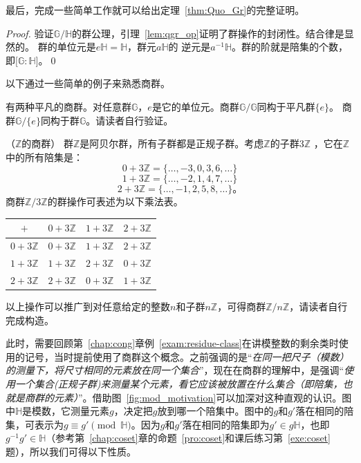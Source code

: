最后，完成一些简单工作就可以给出定理~\ref{thm:Quo_Gr}的完整证明。
\begin{proof}
验证$\mathbb{G}/ \mathbb{H}$的群公理，引理~\ref{lem:qgr_op}证明了群操作的封闭性。结合律是显然的。
群的单位元是$e\mathbb{H} = \mathbb{H}$，群元$a\mathbb{H}$的
逆元是$a^{-1}\mathbb{H}$。群的阶就是陪集的个数，即$\lbrack \mathbb{G}: \mathbb{H}\rbrack$。\qed
\end{proof}

以下通过一些简单的例子来熟悉商群。
\begin{example}
		有两种平凡的商群。对任意群$\mathbb{G}$，$e$是它的单位元。商群$\mathbb{G}/\mathbb{G}$同构于平凡群$\{e\}$。
	商群$\mathbb{G}/\{e\}$同构于群$\mathbb{G}$。请读者自行验证。
\end{example}

\begin{example}{（$\mathbb{Z}$的商群）}
群$\mathbb{Z}$是阿贝尔群，所有子群都是正规子群。考虑$\mathbb{Z}$的子群$3\mathbb{Z}$ ，它在$\mathbb{Z}$中的所有陪集是：
		\[0 + 3\mathbb{Z} = \{\ldots, -3, 0, 3, 6, \ldots \}\]
		\[1 + 3\mathbb{Z} = \{\ldots, -2, 1, 4, 7, \ldots \}\]
		\[2 + 3\mathbb{Z} = \{\ldots, -1, 2, 5, 8, \ldots \}\text{。}\]
商群$\mathbb{Z} / 3\mathbb{Z}$的群操作可表述为以下乘法表。
		
\begin{center}
		\begin{tabular}{|c|c|c|c|}
			\hline 
			$+$ & $0 + 3\mathbb{Z}$  & $1 + 3\mathbb{Z}$  &  $2 + 3\mathbb{Z}$\\ 
			\hline 
			$0 + 3\mathbb{Z}$ & $0 + 3\mathbb{Z}$ & $1 + 3\mathbb{Z}$ & $2 + 3\mathbb{Z}$ \\ 
			\hline 
			$1 + 3\mathbb{Z}$& $1 + 3\mathbb{Z}$ & $2 + 3\mathbb{Z}$ & $0 + 3\mathbb{Z}$ \\ 
			\hline 
			$2 + 3\mathbb{Z}$& $2 + 3\mathbb{Z}$ &  $0 + 3\mathbb{Z}$ & $1 + 3\mathbb{Z}$ \\ 
			\hline 
		\end{tabular} 
 \end{center}	
 以上操作可以推广到对任意给定的整数$n$和子群$n\mathbb{Z}$，可得商群$\mathbb{Z}/ n \mathbb{Z}$，请读者自行完成构造。
\end{example}

此时，需要回顾第~\ref{chap:cong}章例~\ref{exam:residue-class}在讲模整数的剩余类时使用的记号，当时提前使用了商群这个概念。之前强调的是“\emph{在同一把尺子（模数）的测量下，将尺寸相同的元素放在同一个集合}”，现在在商群的理解中，是强调“\emph{使用一个集合(正规子群)来测量某个元素，看它应该被放置在什么集合（即陪集，也就是商群的元素）}”。借助图~\ref{fig:mod_motivation}可以加深对这种直观的认识。图中$\mathbb{H}$是模数，它测量元素$g$，决定把$g$放到哪一个陪集中。图中的$g$和$g'$落在相同的陪集，可表示为$g \equiv g' \pmod{\mathbb{H}}$。因为$g$和$g'$落在相同的陪集即为$g' \in g \mathbb{H}$，也即$g^{-1} g' \in \mathbb{H}$（参考第~\ref{chap:coset}章的命题~\ref{pro:coset}和课后练习第~\ref{exe:coset}题），所以我们可得以下性质。

